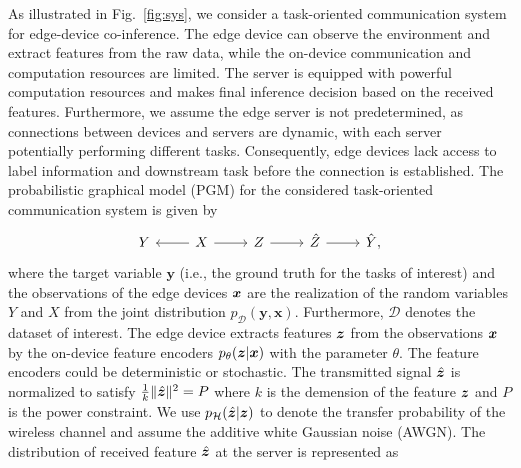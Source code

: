 As illustrated in Fig.~\ref{fig:sys}, we consider a task-oriented communication system for edge-device co-inference. 
The edge device can observe the environment and extract features from the raw data, while the on-device communication and computation resources are limited.
The server is equipped with powerful computation resources and makes final inference decision based on the received features. 
Furthermore, we assume the edge server is not predetermined, as connections between devices and servers are dynamic, with each server potentially performing different tasks. Consequently, edge devices lack access to label information and downstream task before the connection is established.
The probabilistic graphical model (PGM) for the considered task-oriented communication system is given by
\begin{equation}\label{eq:original_graph}
\begin{tikzcd}[row sep=tiny]
    Y&X\arrow[l]\arrow[r]&Z\arrow[r]&\hat{Z}\arrow[r]&\hat{Y},
    \end{tikzcd}
\end{equation}
where the target variable $\boldsymbol{y}$ (i.e., the ground truth for the tasks of interest) and the observations of the edge devices $\boldsymbol{x}$ are the realization of the random variables $Y$ and $X$ from the joint distribution $p_\mathcal{D}(\boldsymbol{y}, \boldsymbol{x})$. Furthermore, $\mathcal{D}$ denotes the dataset of interest. 
The edge device extracts features $\boldsymbol{z}$ from the observations $\boldsymbol{x}$ by the on-device feature encoders $p_{\theta}(\boldsymbol{z}|\boldsymbol{x})$ with the parameter $\theta$. The feature encoders could be deterministic or stochastic. The transmitted signal $\hat{\boldsymbol{z}}$ is normalized to satisfy $\frac{1}{k}\|\hat{\boldsymbol{z}}\|^2= P$ where $k$ is the demension of the feature ${\boldsymbol{z}}$ and $P$ is the power constraint. We use $p_{\mathcal{H}}(\hat{\boldsymbol{z}}|\boldsymbol{z})$ to denote the transfer probability of the wireless channel and assume the additive white Gaussian noise (AWGN). The distribution of received feature $\hat{\boldsymbol{z}}$ at the server is represented as
